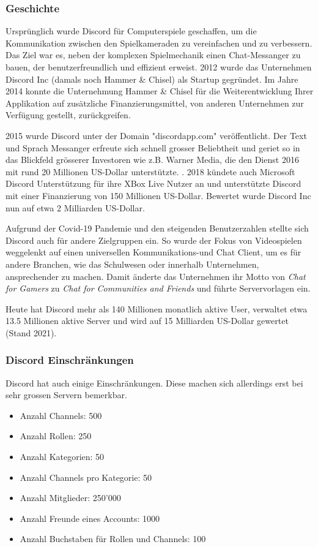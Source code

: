 \documentclass[a4paper, table]{article}
\begin{document}
\subsubsection*{Geschichte}
Urspr\"unglich wurde Discord f\"ur Computerspiele geschaffen, um die Kommunikation zwischen den Spielkameraden zu vereinfachen und zu verbessern.
Das Ziel war es, neben der komplexen Spielmechanik einen Chat-Messanger zu bauen, der benutzerfreundlich und effizient erweist.
2012 wurde das Unternehmen Discord Inc (damals noch Hammer \& Chisel)
als Startup gegr\"undet.\autocite{noauthor_discord_2021}
Im Jahre 2014 konnte die Unternehmung Hammer \& Chisel f\"ur die Weiterentwicklung Ihrer
Applikation auf zus\"atzliche Finanzierungsmittel, von anderen Unternehmen zur Verfügung gestellt, zurückgreifen.

2015 wurde Discord unter der Domain "discordapp.com" ver\"offentlicht.
Der Text und Sprach Messanger erfreute sich schnell grosser Beliebtheit
und geriet so in das Blickfeld grösserer Investoren wie z.B. Warner Media, die den Dienst 2016 mit rund
20 Millionen US-Dollar unterstützte. \autocite{noauthor_warner_2022} .
2018 k\"undete auch Microsoft Discord Unterst\"utzung f\"ur ihre XBox Live Nutzer an und unterst\"utzte Discord mit einer Finanzierung
von 150 Millionen US-Dollar. Bewertet wurde Discord Inc nun auf etwa 2 Milliarden US-Dollar.

Aufgrund der Covid-19 Pandemie und den steigenden Benutzerzahlen stellte sich Discord auch f\"ur andere Zielgruppen ein.
So wurde der Fokus von Videospielen weggelenkt auf einen universellen Kommunikations-und Chat Client, um es f\"ur andere Branchen,
wie das Schulwesen oder innerhalb Unternehmen, ansprechender zu machen.
Damit \"anderte das Unternehmen ihr Motto von \textit{Chat for Gamers} zu
\textit{Chat for Communities and Friends} und f\"uhrte Servervorlagen ein.

Heute hat Discord mehr als 140 Millionen monatlich aktive User, verwaltet etwa 13.5 Millionen aktive Server und
wird auf 15 Milliarden US-Dollar gewertet (Stand 2021). \autocite{david_curry_discord_2022}

\subsubsection*{Discord Einschr\"ankungen}\label{discord_einschraenkungen}
Discord hat auch einige Einschränkungen.
Diese machen sich allerdings erst bei sehr grossen Servern bemerkbar.\autocite{vultaggio_discord_2022}
\begin{itemize}
    \item Anzahl Channels: 500
    \item Anzahl Rollen: 250
    \item Anzahl Kategorien: 50
    \item Anzahl Channels pro Kategorie: 50
    \item Anzahl Mitglieder: 250'000
    \item Anzahl Freunde eines Accounts: 1000
    \item Anzahl Buchstaben für Rollen und Channels: 100
\end{itemize}
\end{document}
